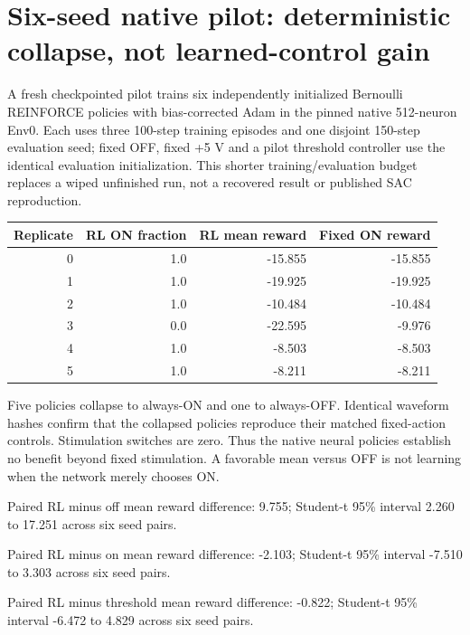 \section{Six-seed native pilot: deterministic collapse, not learned-control gain}

A fresh checkpointed pilot trains six independently initialized Bernoulli REINFORCE policies with bias-corrected Adam in the pinned native 512-neuron Env0. Each uses three 100-step training episodes and one disjoint 150-step evaluation seed; fixed OFF, fixed +5 V and a pilot threshold controller use the identical evaluation initialization. This shorter training/evaluation budget replaces a wiped unfinished run, not a recovered result or published SAC reproduction.

\begin{center}\begin{tabular}{rrrr}\hline Replicate & RL ON fraction & RL mean reward & Fixed ON reward\\\hline

0 & 1.0 & -15.855 & -15.855 \\

1 & 1.0 & -19.925 & -19.925 \\

2 & 1.0 & -10.484 & -10.484 \\

3 & 0.0 & -22.595 & -9.976 \\

4 & 1.0 & -8.503 & -8.503 \\

5 & 1.0 & -8.211 & -8.211 \\

\hline\end{tabular}\end{center}

Five policies collapse to always-ON and one to always-OFF. Identical waveform hashes confirm that the collapsed policies reproduce their matched fixed-action controls. Stimulation switches are zero. Thus the native neural policies establish no benefit beyond fixed stimulation. A favorable mean versus OFF is not learning when the network merely chooses ON.

Paired RL minus off mean reward difference: 9.755; Student-t 95\% interval 2.260 to 17.251 across six seed pairs.

Paired RL minus on mean reward difference: -2.103; Student-t 95\% interval -7.510 to 3.303 across six seed pairs.

Paired RL minus threshold mean reward difference: -0.822; Student-t 95\% interval -6.472 to 4.829 across six seed pairs.

